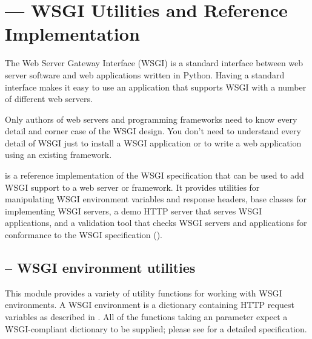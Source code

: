 \section{ --- WSGI Utilities and Reference
Implementation}


The Web Server Gateway Interface (WSGI) is a standard interface
between web server software and web applications written in Python.
Having a standard interface makes it easy to use an application
that supports WSGI with a number of different web servers.

Only authors of web servers and programming frameworks need to know
every detail and corner case of the WSGI design.  You don't need to
understand every detail of WSGI just to install a WSGI application or
to write a web application using an existing framework.

 is a reference implementation of the WSGI specification
that can be used to add WSGI support to a web server or framework.  It
provides utilities for manipulating WSGI environment variables and
response headers, base classes for implementing WSGI servers, a demo
HTTP server that serves WSGI applications, and a validation tool that
checks WSGI servers and applications for conformance to the
WSGI specification ().















\subsection{ -- WSGI environment utilities}

This module provides a variety of utility functions for working with
WSGI environments.  A WSGI environment is a dictionary containing
HTTP request variables as described in .  All of the functions
taking an  parameter expect a WSGI-compliant dictionary to
be supplied; please see  for a detailed specification.

